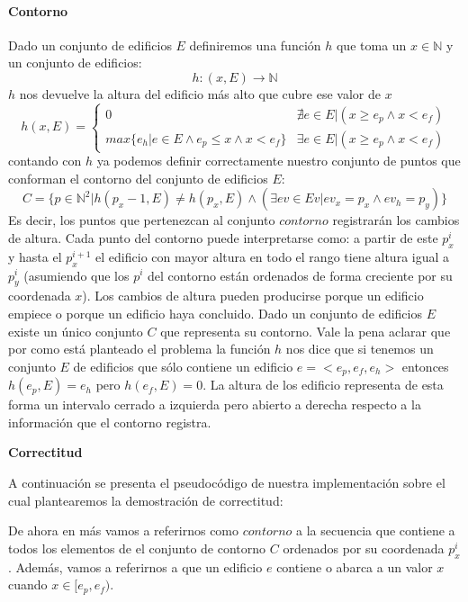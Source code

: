 \paragraph{Contorno}
Dado un conjunto de edificios $E$ definiremos una función $h$ que toma un $x \in \mathbb{N}$ y un conjunto de edificios:
\begin{displaymath}
	h: (x,E) \to \mathbb{N} 
\end{displaymath}
$h$ nos devuelve la altura del edificio más alto que cubre ese valor de $x$ 
\begin{displaymath}
	h(x, E) = \begin{cases} 
						0 & \nexists e \in E | (x \geq e_p \land x < e_f) \\
						max\{ e_h | e \in E  \land e_p \leq x \land x < e_f \} & \exists e \in E | (x \geq e_p \land x < e_f)
				\end{cases} %
\end{displaymath}
contando con $h$ ya podemos definir correctamente nuestro conjunto de puntos que conforman el contorno del
conjunto de edificios $E$:
\begin{displaymath}
	C = \{ p \in \mathbb{N}^2 | h(p_x - 1, E) \neq h(p_x, E) \land (\exists ev \in Ev | ev_x = p_x \land ev_h = p_y) \}
\end{displaymath}
Es decir, los puntos que pertenezcan al conjunto $contorno$ registrarán los cambios de altura. Cada punto
del contorno puede interpretarse como: a partir de este $p_x^i$ y hasta el $p_x^{i+1}$ el edificio con mayor
altura en todo el rango tiene altura igual a $p_y^i$ (asumiendo que los $p^i$ del contorno están ordenados
de forma creciente por su coordenada $x$). Los cambios de altura pueden producirse
porque un edificio empiece o porque un edificio haya concluido. 
Dado un conjunto de edificios $E$ existe un único conjunto $C$ que representa su contorno. 
Vale la pena aclarar que por como está planteado el problema la función $h$ nos dice que si tenemos un conjunto $E$
de edificios que sólo contiene un edificio $e = <e_p, e_f, e_h>$ entonces $h(e_p, E) = e_h$ pero $h(e_f, E) = 0$.
La altura de los edificio representa de esta forma un intervalo cerrado a izquierda pero abierto a derecha
respecto a la información que el contorno registra.

\textbf{Correctitud}
\par
A continuación se presenta el pseudocódigo de nuestra implementación sobre el cual plantearemos la
demostración de correctitud:

De ahora en más vamos a referirnos como $contorno$ a la secuencia que contiene a todos los elementos de
el conjunto de contorno $C$ ordenados por su coordenada $p_x^i$. Además, vamos a referirnos a que un
edificio $e$ contiene o abarca a un valor $x$ cuando $x \in [e_p, e_f)$.

